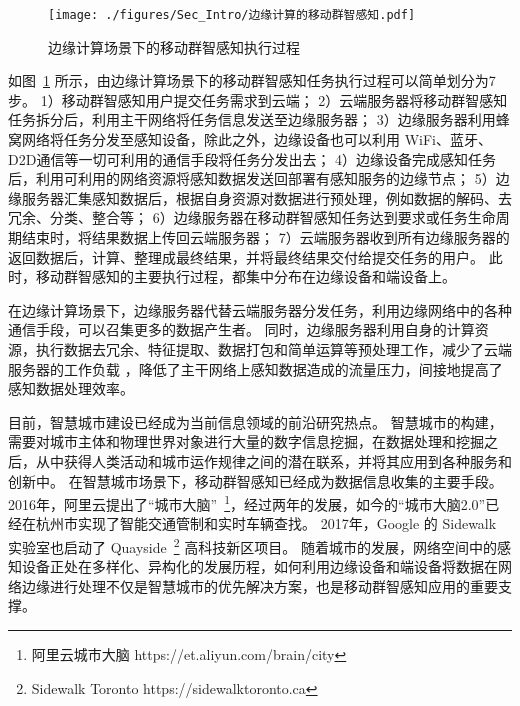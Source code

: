 \begin{figure}[!ht]
  \centering
  \vspace{-1em}
  \texttt{[image: ./figures/Sec\_Intro/边缘计算的移动群智感知.pdf]}
  \vspace{-0.5em}
  \caption{边缘计算场景下的移动群智感知执行过程}
  \vspace{-1em}
  \label{Figure_MCS_with_EC}
\end{figure}

如图~\ref{Figure_MCS_with_EC} 所示，由边缘计算场景下的移动群智感知任务执行过程可以简单划分为7步。
1）移动群智感知用户提交任务需求到云端；
2）云端服务器将移动群智感知任务拆分后，利用主干网络将任务信息发送至边缘服务器；
3）边缘服务器利用蜂窝网络将任务分发至感知设备，除此之外，边缘设备也可以利用 WiFi、蓝牙、D2D通信等一切可利用的通信手段将任务分发出去；
4）边缘设备完成感知任务后，利用可利用的网络资源将感知数据发送回部署有感知服务的边缘节点；
5）边缘服务器汇集感知数据后，根据自身资源对数据进行预处理，例如数据的解码、去冗余、分类、整合等；
6）边缘服务器在移动群智感知任务达到要求或任务生命周期结束时，将结果数据上传回云端服务器；
7）云端服务器收到所有边缘服务器的返回数据后，计算、整理成最终结果，并将最终结果交付给提交任务的用户。
此时，移动群智感知的主要执行过程，都集中分布在边缘设备和端设备上。

在边缘计算场景下，边缘服务器代替云端服务器分发任务，利用边缘网络中的各种通信手段，可以召集更多的数据产生者。
同时，边缘服务器利用自身的计算资源，执行数据去冗余、特征提取、数据打包和简单运算等预处理工作，减少了云端服务器的工作负载 ，降低了主干网络上感知数据造成的流量压力，间接地提高了感知数据处理效率。


目前，智慧城市建设已经成为当前信息领域的前沿研究热点。
智慧城市的构建，需要对城市主体和物理世界对象进行大量的数字信息挖掘，在数据处理和挖掘之后，从中获得人类活动和城市运作规律之间的潜在联系，并将其应用到各种服务和创新中。
在智慧城市场景下，移动群智感知已经成为数据信息收集的主要手段。
2016年，阿里云提出了“城市大脑”~\footnote{阿里云城市大脑 https://et.aliyun.com/brain/city}，经过两年的发展，如今的“城市大脑2.0”已经在杭州市实现了智能交通管制和实时车辆查找。
2017年，Google 的 Sidewalk 实验室也启动了 Quayside~\footnote{Sidewalk Toronto https://sidewalktoronto.ca} 高科技新区项目。
随着城市的发展，网络空间中的感知设备正处在多样化、异构化的发展历程，如何利用边缘设备和端设备将数据在网络边缘进行处理不仅是智慧城市的优先解决方案，也是移动群智感知应用的重要支撑。

